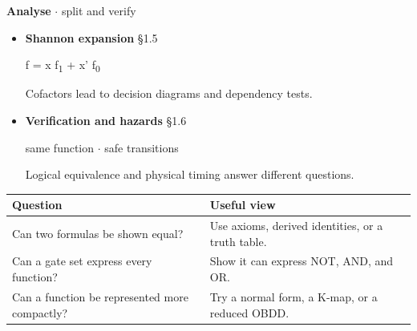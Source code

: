 \documentclass[11pt]{article}
\begin{document}
\begin{keepsection}
\textbf{Analyse} \ensuremath{\cdot} split and verify

\begin{itemize}
\item 
{}
\textbf{Shannon expansion} \hfill{\small\color{FAUblue}§1.5}

f = x f\textsubscript{1} + x' f\textsubscript{0}

Cofactors lead to decision diagrams and dependency tests.

\item 
{}
\textbf{Verification and hazards} \hfill{\small\color{FAUblue}§1.6}

same function \ensuremath{\cdot} safe transitions

Logical equivalence and physical timing answer different questions.

\end{itemize}

\begin{center}\small\begin{tabularx}{\linewidth}{>{\raggedright\arraybackslash}X>{\raggedright\arraybackslash}X}\toprule
\textbf{Question} & \textbf{Useful view} \\ \midrule
Can two formulas be shown equal? & Use axioms, derived identities, or a truth table. \\
Can a gate set express every function? & Show it can express NOT, AND, and OR. \\
Can a function be represented more compactly? & Try a normal form, a K-map, or a reduced OBDD. \\
\bottomrule\end{tabularx}\end{center}
\end{keepsection}
\end{document}
